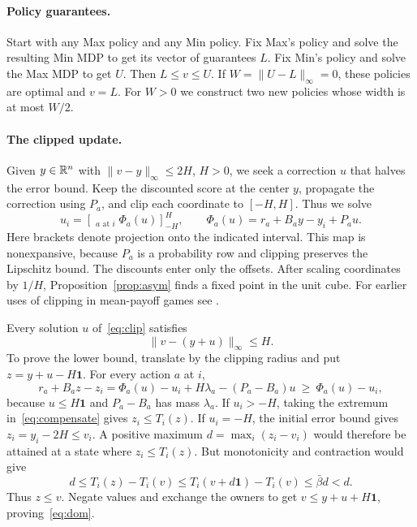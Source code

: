 \paragraph{Policy guarantees.}
Start with any Max policy and any Min policy. Fix Max's policy and
solve the resulting Min MDP to get its vector of guarantees \(L\).
Fix Min's policy and solve the Max MDP to get \(U\). Then
\(L\le v\le U\). If \(W=\|U-L\|_\infty=0\), these policies are
optimal and \(v=L\). For \(W>0\) we construct two new policies whose
width is at most \(W/2\).

\paragraph{The clipped update.}
Given \(y\in\mathbb R^n\) with \(\|v-y\|_\infty\le 2H\), \(H>0\), we seek
a correction \(u\) that halves the error bound. Keep the discounted
score at the center \(y\), propagate the correction using \(P_a\),
and clip each coordinate to \([-H,H]\). Thus we solve
\begin{equation}\label{eq:clip}
 u_i=\left[\mathop{\mathrm{ext}_i}_{a\text{ at }i}
              \Phi_a(u)\right]_{-H}^{H},\qquad
 \Phi_a(u)=r_a+B_a y-y_i+P_a u .
\end{equation}
Here brackets denote projection onto the indicated interval. This
map is nonexpansive, because \(P_a\) is a probability row and clipping
preserves the Lipschitz bound. The discounts enter only the offsets.
After scaling coordinates by \(1/H\), Proposition~\ref{prop:asym}
finds a fixed point in the unit cube. For earlier uses of clipping in
mean-payoff games see \cite{OAIRa,OAIDe}.

Every solution \(u\) of~\eqref{eq:clip} satisfies
\begin{equation}\label{eq:dom}
    \|v-(y+u)\|_\infty\le H .
\end{equation}
To prove the lower bound, translate by the clipping radius and put
\(z=y+u-H\mathbf1\). For every action \(a\) at \(i\),
\begin{equation}\label{eq:compensate}
 r_a+B_a z-z_i
 =\Phi_a(u)-u_i+H\lambda_a-(P_a-B_a)u
 \ \ge\ \Phi_a(u)-u_i ,
\end{equation}
because \(u\le H\mathbf1\) and \(P_a-B_a\) has mass \(\lambda_a\).
If \(u_i>-H\), taking the extremum in~\eqref{eq:compensate} gives
\(z_i\le T_i(z)\). If \(u_i=-H\), the initial error bound gives
\(z_i=y_i-2H\le v_i\). A positive maximum
\(d=\max_i(z_i-v_i)\) would therefore be attained at a state where
\(z_i\le T_i(z)\). But monotonicity and contraction would give
\[
  d\le T_i(z)-T_i(v)
    \le T_i(v+d\mathbf1)-T_i(v)\le\bar\beta d<d .
\]
Thus \(z\le v\). Negate values and exchange the owners to get
\(v\le y+u+H\mathbf1\), proving~\eqref{eq:dom}.

